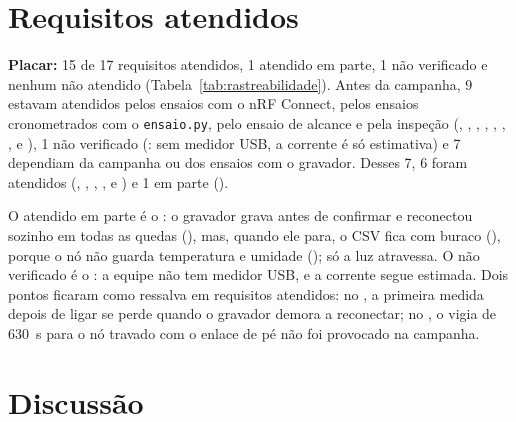 \section{Requisitos atendidos}

\noindent\textbf{Placar:} 15 de 17 requisitos atendidos, 1 atendido em
parte, 1 não verificado e nenhum não atendido
(Tabela~\ref{tab:rastreabilidade}). Antes da campanha, 9 estavam atendidos
pelos ensaios com o nRF Connect, pelos ensaios cronometrados com o
\texttt{ensaio.py}, pelo ensaio de alcance e pela inspeção (,
, , , , , ,  e
), 1 não verificado (: sem medidor USB, a corrente é só
estimativa) e 7 dependiam da campanha ou dos ensaios com o gravador. Desses 7, 6
foram atendidos (, , , ,  e
) e 1 em parte ().

O atendido em parte é o : o gravador grava antes de confirmar e
reconectou sozinho em todas as quedas (), mas, quando ele para, o
CSV fica com buraco (), porque o nó não guarda temperatura e
umidade (); só a luz atravessa. O não verificado é o : a
equipe não tem medidor USB, e a corrente segue estimada. Dois pontos
ficaram como ressalva em requisitos atendidos: no , a primeira
medida depois de ligar se perde quando o gravador demora a reconectar; no
, o vigia de \SI{630}{\second} para o nó travado com o enlace de
pé não foi provocado na campanha.

\section{Discussão}

